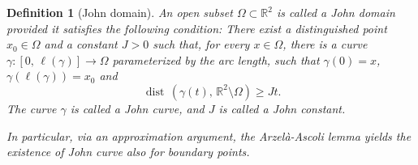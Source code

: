 \documentclass[reqno,11pt]{amsart}
\makeatletter
\def\dist{{\mathop\mathrm{\,dist\,}}}
\def\ez{\epsilon}
\def\gz{{\gamma}}
\def\boz{{\Omega}}
\def\r{\right}
\def\lf{\left}
\newtheorem{defn}[thm]{Definition}%
\numberwithin{equation}{section}
\theoremstyle{remark}
\makeatother
\begin{document}
\begin{defn}[John domain]\label{John}
An open subset $\Omega\subset \mathbb R^2$ is called a John domain provided it satisfies the following condition:
There exist a distinguished point $x_0 \in \Omega$ and a constant $J>0$ such that, for every $x\in\Omega$, 
there is a curve $\gamma\colon [0,\,\ell(\gamma)] \to \Omega$ parameterized by the arc length, such that $\gamma(0)= x$, $\gamma(\ell(\gamma))= x_0$
and
\[
\dist(\gamma(t),\, \mathbb R^2\setminus\Omega)\ge Jt. 
\]
The curve $\gamma$ is called a John curve, and $J$ is called a John constant. 

 In particular, via an approximation argument, the Arzel\`a-Ascoli lemma  yields the existence of John curve also for boundary points. 
\end{defn}


%
\end{document}
